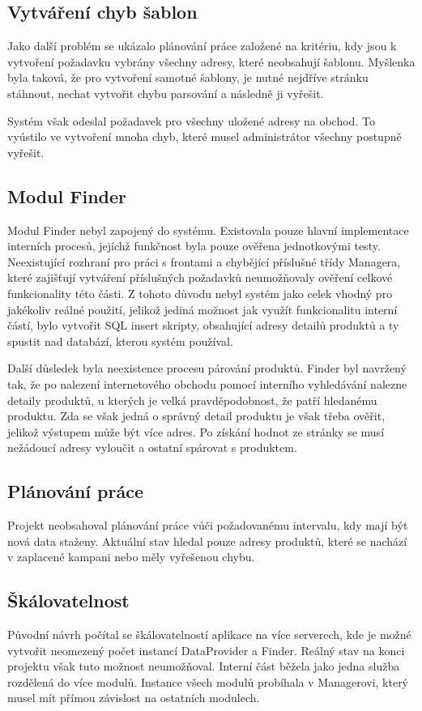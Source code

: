 \documentclass[thesis=B,czech]{FITthesis}[2012/06/26]
\begin{document}
\subsection{Vytváření chyb šablon}
Jako další problém se ukázalo plánování práce založené na kritériu, kdy jsou k vytvoření požadavku vybrány všechny adresy, které neobsahují šablonu.
Myšlenka byla taková, že pro vytvoření samotné šablony, je nutné nejdříve stránku stáhnout, nechat vytvořit chybu parsování
a následně ji vyřešit.
\par
Systém však odeslal požadavek pro všechny uložené adresy na obchod. To vyústilo ve vytvoření mnoha chyb, 
které musel administrátor všechny postupně vyřešit.
\par
\subsection{Modul Finder}
Modul Finder nebyl zapojený do systému. Existovala pouze hlavní implementace interních procesů, jejíchž funkčnost byla
pouze ověřena jednotkovými testy. Neexistující rozhraní pro práci s frontami a chybějící příslušné třídy Managera, které zajišťují vytváření příslušných požadavků neumožňovaly ověření celkové funkcionality této části. Z tohoto důvodu nebyl systém jako celek vhodný pro jakékoliv reálné použití, jelikož
jediná možnost jak využít funkcionalitu interní částí, bylo vytvořit SQL insert skripty, obsahující adresy detailů produktů
a ty spustit nad databází, kterou systém používal.
\par
Další důsledek byla neexistence procesu párování produktů. Finder byl navržený tak, že po nalezení internetového obchodu
pomocí interního vyhledávání nalezne detaily produktů, u kterých je velká pravděpodobnost, že patří hledanému produktu.
Zda se však jedná o správný detail produktu je však třeba ověřit, jelikož výstupem může být více adres. Po získání hodnot ze stránky se musí nežádoucí adresy vyloučit a ostatní spárovat s produktem.
\subsection{Plánování práce}
Projekt neobsahoval plánování práce vůči požadovanému intervalu, kdy mají být nová data
staženy. Aktuální stav hledal pouze adresy produktů, které se nachází v zaplacené kampani nebo měly vyřešenou chybu.
\subsection{Škálovatelnost}
Původní návrh počítal se škálovatelností aplikace na více serverech, kde je možné vytvořit neomezený počet instancí DataProvider a Finder. Reálný stav na konci projektu však tuto možnost neumožňoval. Interní část běžela jako jedna služba rozdělená do více modulů. 
Instance všech modulů probíhala v Managerovi, který musel mít přímou závislost na ostatních modulech.
\end{document}
